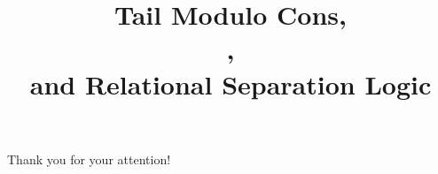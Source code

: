 \documentclass[aspectratio=169]{beamer}
\title{
	Tail Modulo Cons, \\
	\OCaml, \\
	and Relational Separation Logic
}
\date{}
\begin{document}

\begin{frame}
\titlepage
\end{frame}









\begin{frame}
\LARGE
\begin{center}
	Thank you for your attention!
\end{center}
\end{frame}


\appendix


\end{document}
